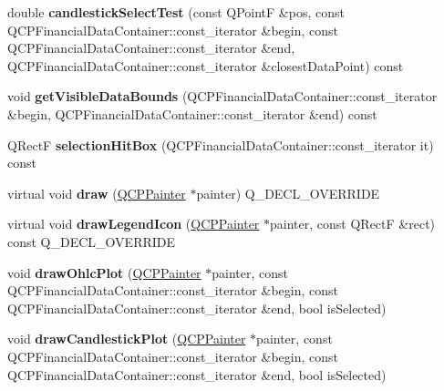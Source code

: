 \begin{DoxyCompactItemize}
\item 
double {\bfseries candlestick\+Select\+Test} (const Q\+PointF \&pos, const Q\+C\+P\+Financial\+Data\+Container\+::const\+\_\+iterator \&begin, const Q\+C\+P\+Financial\+Data\+Container\+::const\+\_\+iterator \&end, Q\+C\+P\+Financial\+Data\+Container\+::const\+\_\+iterator \&closest\+Data\+Point) const \hypertarget{class_q_c_p_financial_a34bf41e29ade0ea6840536279c10b58c}{}\label{class_q_c_p_financial_a34bf41e29ade0ea6840536279c10b58c}

\item 
void {\bfseries get\+Visible\+Data\+Bounds} (Q\+C\+P\+Financial\+Data\+Container\+::const\+\_\+iterator \&begin, Q\+C\+P\+Financial\+Data\+Container\+::const\+\_\+iterator \&end) const \hypertarget{class_q_c_p_financial_ad650d7fd0f498f6ca65460a031c37515}{}\label{class_q_c_p_financial_ad650d7fd0f498f6ca65460a031c37515}

\item 
Q\+RectF {\bfseries selection\+Hit\+Box} (Q\+C\+P\+Financial\+Data\+Container\+::const\+\_\+iterator it) const \hypertarget{class_q_c_p_financial_ae31f1142fadc67b2721698ec3153b7d5}{}\label{class_q_c_p_financial_ae31f1142fadc67b2721698ec3153b7d5}

\item 
virtual void {\bfseries draw} (\hyperlink{class_q_c_p_painter}{Q\+C\+P\+Painter} $\ast$painter) Q\+\_\+\+D\+E\+C\+L\+\_\+\+O\+V\+E\+R\+R\+I\+DE\hypertarget{class_q_c_p_financial_a0b631bf26922fcad254f6c01f1e57c8f}{}\label{class_q_c_p_financial_a0b631bf26922fcad254f6c01f1e57c8f}

\item 
virtual void {\bfseries draw\+Legend\+Icon} (\hyperlink{class_q_c_p_painter}{Q\+C\+P\+Painter} $\ast$painter, const Q\+RectF \&rect) const Q\+\_\+\+D\+E\+C\+L\+\_\+\+O\+V\+E\+R\+R\+I\+DE\hypertarget{class_q_c_p_financial_a7ece3ce5522ea36a19fdf64ff97e79ec}{}\label{class_q_c_p_financial_a7ece3ce5522ea36a19fdf64ff97e79ec}

\item 
void {\bfseries draw\+Ohlc\+Plot} (\hyperlink{class_q_c_p_painter}{Q\+C\+P\+Painter} $\ast$painter, const Q\+C\+P\+Financial\+Data\+Container\+::const\+\_\+iterator \&begin, const Q\+C\+P\+Financial\+Data\+Container\+::const\+\_\+iterator \&end, bool is\+Selected)\hypertarget{class_q_c_p_financial_a2c77aab636f6bce6e0407b3f94e90d08}{}\label{class_q_c_p_financial_a2c77aab636f6bce6e0407b3f94e90d08}

\item 
void {\bfseries draw\+Candlestick\+Plot} (\hyperlink{class_q_c_p_painter}{Q\+C\+P\+Painter} $\ast$painter, const Q\+C\+P\+Financial\+Data\+Container\+::const\+\_\+iterator \&begin, const Q\+C\+P\+Financial\+Data\+Container\+::const\+\_\+iterator \&end, bool is\+Selected)\hypertarget{class_q_c_p_financial_ade6b703369d8acb3bfa0b8e244df4b06}{}\label{class_q_c_p_financial_ade6b703369d8acb3bfa0b8e244df4b06}


\end{DoxyCompactItemize}

